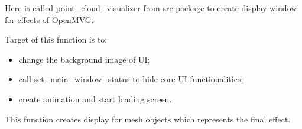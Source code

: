 \documentclass[letterpaper,10pt,english]{sphinxmanual}
\begin{document}
\begin{fulllineitems}

\begin{fulllineitems}
\label{\detokenize{main:main.MainWindow.cloud_display}}
\pysigstartsignatures
{}
\pysigstopsignatures
\sphinxAtStartPar
Here is called point\_cloud\_visualizer from src package to create display window for effects of OpenMVG.

\end{fulllineitems}


\begin{fulllineitems}
\label{\detokenize{main:main.MainWindow.loading_screen}}
\pysigstartsignatures
{}
\pysigstopsignatures
\sphinxAtStartPar
Target of this function is to:
\begin{itemize}
\item {} 
\sphinxAtStartPar
change the background image of UI;

\item {} 
\sphinxAtStartPar
call set\_main\_window\_status to hide core UI functionalities;

\item {} 
\sphinxAtStartPar
create animation and start loading screen.

\end{itemize}

\end{fulllineitems}


\begin{fulllineitems}
\label{\detokenize{main:main.MainWindow.mesh_display}}
\pysigstartsignatures
{}
\pysigstopsignatures
\sphinxAtStartPar
This function creates display for mesh objects which represents the final effect.

\end{fulllineitems}



\end{fulllineitems}
\end{document}

